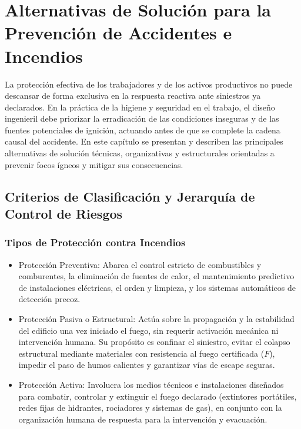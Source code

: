 \chapter{Alternativas de Solución para la Prevención de Accidentes e Incendios}
\label{sec.cap7:alternativas_solucion}

La protección efectiva de los trabajadores y de los activos productivos no puede descansar de forma exclusiva en la
respuesta reactiva ante siniestros ya declarados. En la práctica de la higiene y seguridad en el trabajo, el diseño
ingenieril debe priorizar la erradicación de las condiciones inseguras y de las fuentes potenciales de ignición,
actuando antes de que se complete la cadena causal del accidente. En este capítulo se presentan y describen las
principales alternativas de solución técnicas, organizativas y estructurales orientadas a prevenir focos ígneos y
mitigar sus consecuencias.

\section{Criterios de Clasificación y Jerarquía de Control de Riesgos}
\label{sec.cap7:jerarquia_control}

\subsection{Tipos de Protección contra Incendios}
\begin{itemize}
    \item Protección Preventiva:  Abarca el control estricto de combustibles y comburentes, la eliminación de fuentes de calor, el
          mantenimiento predictivo de instalaciones eléctricas, el orden y limpieza, y los sistemas automáticos de
          detección precoz.
    \item Protección Pasiva o Estructural: Actúa sobre la propagación y la estabilidad del edificio una vez iniciado el
          fuego, sin requerir activación mecánica ni intervención humana. Su propósito es confinar el siniestro, evitar
          el colapso estructural mediante materiales con resistencia al fuego certificada ($F$), impedir el paso de
          humos calientes y garantizar vías de escape seguras.
    \item Protección Activa: Involucra los medios técnicos e instalaciones diseñados para combatir, controlar y
          extinguir el fuego declarado (extintores portátiles, redes fijas de hidrantes, rociadores y sistemas de gas),
          en conjunto con la organización humana de respuesta para la intervención y evacuación.
\end{itemize}

